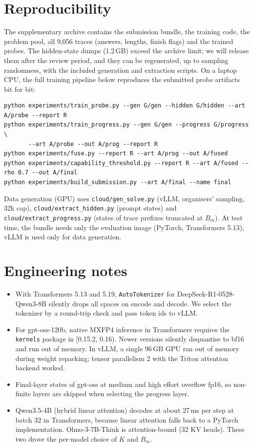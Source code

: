 \documentclass{article}
\begin{document}
\section{Reproducibility}
\label{app:repro}
The supplementary archive contains the submission bundle, the training code, the problem pool, all 9{,}056 traces (answers, lengths, finish flags) and the trained probes.
The hidden-state dumps (1.2\,GB) exceed the archive limit; we will release them after the review period, and they can be regenerated, up to sampling randomness, with the included generation and extraction scripts.
On a laptop CPU, the full training pipeline below reproduces the submitted probe artifacts bit for bit:
{\footnotesize
\begin{verbatim}
python experiments/train_probe.py --gen G/gen --hidden G/hidden --art A/probe --report R
python experiments/train_progress.py --gen G/gen --progress G/progress \
       --art A/probe --out A/prog --report R
python experiments/fuse.py --report R --art A/prog --out A/fused
python experiments/capability_threshold.py --report R --art A/fused --rho 0.7 --out A/final
python experiments/build_submission.py --art A/final --name final
\end{verbatim}
}
Data generation (GPU) uses \texttt{cloud/gen\_solve.py} (vLLM, organisers' sampling, 32k cap), \texttt{cloud/extract\_hidden.py} (prompt states) and \texttt{cloud/extract\_progress.py} (states of trace prefixes truncated at $B_m$).
At test time, the bundle needs only the evaluation image (PyTorch, Transformers 5.13); vLLM is used only for data generation.

\section{Engineering notes}
\begin{itemize}
  \item With Transformers 5.13 and 5.19, \texttt{AutoTokenizer} for DeepSeek-R1-0528-Qwen3-8B silently drops all spaces on encode and decode. We select the tokenizer by a round-trip check and pass token ids to vLLM.
  \item For gpt-oss-120b, native MXFP4 inference in Transformers requires the \texttt{kernels} package in [0.15.2, 0.16). Newer versions silently dequantise to bf16 and run out of memory. In vLLM, a single 96\,GB GPU ran out of memory during weight repacking; tensor parallelism 2 with the Triton attention backend worked.
  \item Final-layer states of gpt-oss at medium and high effort overflow fp16, so non-finite layers are skipped when selecting the progress layer.
  \item Qwen3.5-4B (hybrid linear attention) decodes at about 27\,ms per step at batch 32 in Transformers, because linear attention falls back to a PyTorch implementation. Olmo-3-7B-Think is attention-bound (32 KV heads). These two drove the per-model choice of $K$ and $B_m$.
\end{itemize}
\end{document}
